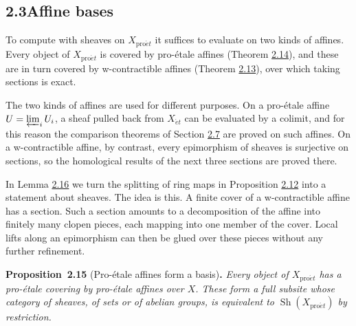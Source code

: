 \documentclass[11pt]{article}
\newenvironment{bpstatement}[2]{\par\addvspace{0.6\baselineskip}\noindent\textbf{#1}#2\textbf{.}\enspace\ignorespaces}
  {\par\addvspace{0.4\baselineskip}}
\newenvironment{bpstatementit}[2]{\begin{bpstatement}{#1}{#2}\itshape\ignorespaces}{\end{bpstatement}}
\providecommand{\Sh}{}\renewcommand{\Sh}{\operatorname{Sh}}
\begin{document}
\subsection*{\texorpdfstring{2.3\quad Affine bases}{2.3 Affine bases}}
\label{bp44}%
\label{bp45}%
To compute with sheaves on \(X_{\mathrm{pro}\acute{e}t}\) it suffices to evaluate on two kinds of affines. Every object of \(X_{\mathrm{pro}\acute{e}t}\) is covered by pro-étale affines (Theorem \hyperref[bp42]{2.14}), and these are in turn covered by w-contractible affines (Theorem \hyperref[bp39]{2.13}), over which taking sections is exact.

The two kinds of affines are used for different purposes. On a pro-étale affine \(U=\varprojlim_iU_i\), a sheaf pulled back from \(X_{\acute{e}t}\) can be evaluated by a colimit, and for this reason the comparison theorems of Section \hyperref[bp89]{2.7} are proved on such affines. On a w-contractible affine, by contrast, every epimorphism of sheaves is surjective on sections, so the homological results of the next three sections are proved there.

In Lemma \hyperref[bp49]{2.16} we turn the splitting of ring maps in Proposition \hyperref[bp36]{2.12} into a statement about sheaves. The idea is this. A finite cover of a w-contractible affine has a section. Such a section amounts to a decomposition of the affine into finitely many clopen pieces, each mapping into one member of the cover. Local lifts along an epimorphism can then be glued over these pieces without any further refinement.

\label{bp46}%
\begin{bpstatementit}{Proposition~2.15}{ (Pro-étale affines form a basis)}
Every object of \(X_{\mathrm{pro}\acute{e}t}\) has a pro-étale covering by pro-étale affines over \(X\). These form a full subsite whose category of sheaves, of sets or of abelian groups, is equivalent to \(\Sh(X_{\mathrm{pro}\acute{e}t})\) by restriction.
\end{bpstatementit}
\end{document}
